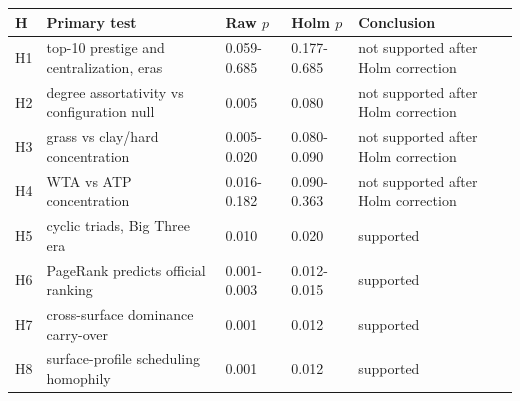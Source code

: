 \begin{tabular}{@{}llp{1.6cm}p{1.6cm}l@{}}
\toprule
H & Primary test & Raw $p$ & Holm $p$ & Conclusion \\
\midrule
H1 & top-10 prestige and centralization, eras & 0.059-0.685 & 0.177-0.685 & not supported after Holm correction \\
H2 & degree assortativity vs configuration null & 0.005 & 0.080 & not supported after Holm correction \\
H3 & grass vs clay/hard concentration & 0.005-0.020 & 0.080-0.090 & not supported after Holm correction \\
H4 & WTA vs ATP concentration & 0.016-0.182 & 0.090-0.363 & not supported after Holm correction \\
H5 & cyclic triads, Big Three era & 0.010 & 0.020 & supported \\
H6 & PageRank predicts official ranking & 0.001-0.003 & 0.012-0.015 & supported \\
H7 & cross-surface dominance carry-over & 0.001 & 0.012 & supported \\
H8 & surface-profile scheduling homophily & 0.001 & 0.012 & supported \\
\bottomrule
\end{tabular}
